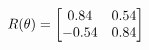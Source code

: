 \documentclass[preview]{standalone}
\begin{document}
\begin{align*}
\special{dvisvgm:raw <g id='unique000'>}R(\theta) = \begin{bmatrix}0.84 & 0.54\\-0.54 & 0.84\end{bmatrix}\special{dvisvgm:raw </g>}
\end{align*}
\end{document}
